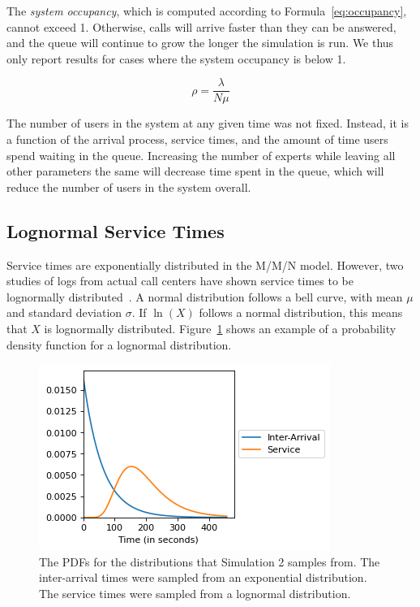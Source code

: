 The \emph{system occupancy}, which is computed according to
Formula~\ref{eq:occupancy}, cannot exceed 1.
Otherwise, calls will arrive faster than they can be answered, and the queue
will continue to grow the longer the simulation is run.
We thus only report results for cases where the system occupancy is below 1.

\vspace{-0.5cm}

\begin{equation}
\rho = \frac{\lambda}{N \mu}
\label{eq:occupancy}
\end{equation}

The number of users in the system at any given time was not fixed.
Instead, it is a function of the arrival process, service times, and the amount
of time users spend waiting in the queue.
Increasing the number of experts while leaving all other parameters the same
will decrease time spent in the queue, which will reduce the number of users in
the system overall.

\vspace{-0.5cm}

\subsection{Lognormal Service Times}\label{sec:sim_lognormal}

Service times are exponentially distributed in the M/M/N model.
However, two studies of logs from actual call centers have shown service times
to be lognormally distributed~\cite{queue1, queue2}.
A normal distribution follows a bell curve, with mean $\mu$ and standard
deviation $\sigma$.
If $\ln{(X)}$ follows a normal distribution, this means that $X$ is lognormally
distributed.
Figure~\ref{fig:simple_sim2_dists} shows an example of a probability density
function for a lognormal distribution.

\begin{figure}[h]
  \vspace{-0.5cm}
  \includegraphics{figures/montecarlo/expon_lognorm.png}
  \vspace{-0.5cm}
  \caption[The PDFs for the distributions that Simulation 2 samples from]{
    The PDFs for the distributions that Simulation 2 samples from.
    The inter-arrival times were sampled from an exponential distribution.
    The service times were sampled from a lognormal distribution.
  }\label{fig:simple_sim2_dists}
  \vspace{-0.2cm}
\end{figure}

